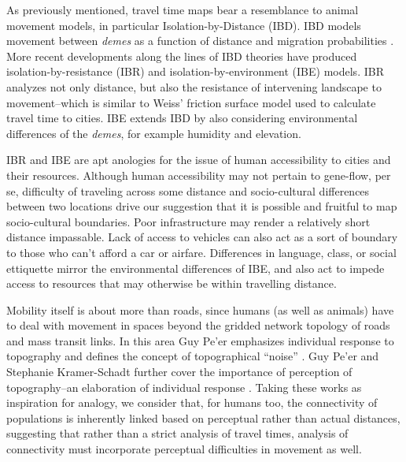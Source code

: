 \documentclass[draft]{article}
\begin{document}
As previously mentioned, travel time maps bear a resemblance to animal movement models, in particular Isolation-by-Distance (IBD).
IBD models movement between {\em demes} as a function of distance and migration probabilities \cite{ishida09}.  More recent developments along the lines of IBD theories have produced isolation-by-resistance (IBR) \cite{mcrae06} and isolation-by-environment (IBE) \cite{wang14} models.  IBR analyzes not only distance, but also the resistance of intervening landscape to movement--which is similar to Weiss' friction surface model used to calculate travel time to cities.  IBE extends IBD by also considering environmental differences of the {\em demes}, for example humidity and elevation.

IBR and IBE are apt anologies for the issue of human accessibility to cities and their resources.  Although human accessibility may not pertain to gene-flow, per se, difficulty of traveling across some distance and socio-cultural differences between two locations drive our suggestion that it is possible and fruitful to map socio-cultural boundaries.  Poor infrastructure may render a relatively short distance impassable.  Lack of access to vehicles can also act as a sort of boundary to those who can't afford a car or airfare.  Differences in language, class, or social ettiquette mirror the environmental differences of IBE, and also act to impede access to resources that may otherwise be within travelling distance.


Mobility itself is about more than roads, since humans (as well as animals) have to deal with movement in spaces beyond the gridded network topology of roads and mass transit links. In this area  Guy Pe'er emphasizes individual response to topography and defines the concept of topographical ``noise'' \cite{peer06}. Guy Pe'er and Stephanie Kramer-Schadt further cover %
the importance of perception of topography--an elaboration of individual response \cite{peer08}. Taking these works as inspiration for analogy, we consider that, for humans too, the connectivity of populations is inherently linked based on perceptual rather than actual distances, suggesting that rather than a strict analysis of travel times, analysis of connectivity must incorporate perceptual difficulties in movement as well.
\end{document}
